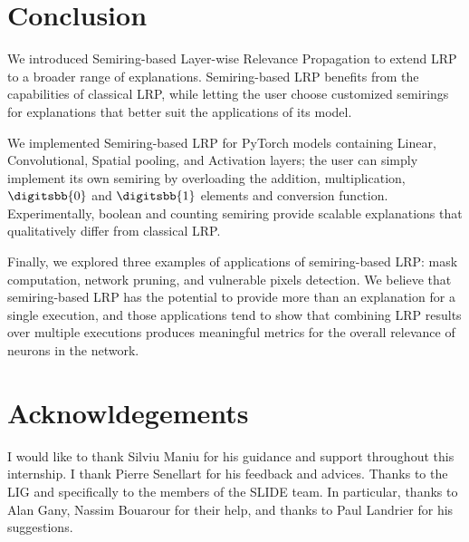 \documentclass{../cs-classes/cs-classes}
\newcommand*{\1}{\digitsbb{1}}
\newcommand*{\0}{\digitsbb{0}}
\begin{document}
\section{Conclusion}
We introduced Semiring-based Layer-wise Relevance Propagation to extend LRP to a broader range of explanations. Semiring-based LRP benefits from the capabilities of classical LRP, while letting the user choose customized semirings for explanations that better suit the applications of its model. 

We implemented Semiring-based LRP for PyTorch models containing Linear, Convolutional, Spatial pooling, and Activation layers; the user can simply implement its own semiring by overloading the addition, multiplication, $\0$ and $\1$ elements and conversion function. Experimentally, boolean and counting semiring provide scalable explanations that qualitatively differ from classical LRP.

Finally, we explored three examples of applications of semiring-based LRP: mask computation, network pruning, and vulnerable pixels detection. We believe that semiring-based LRP has the potential to provide more than an explanation for a single execution, and those applications tend to show that combining LRP results over multiple executions produces meaningful metrics for the overall relevance of neurons in the network. 

\section*{Acknowldegements}
I would like to thank Silviu Maniu for his guidance and support throughout this internship. I thank Pierre Senellart for his feedback and advices. Thanks to the LIG and specifically to the members of the SLIDE team. In particular, thanks to Alan Gany, Nassim Bouarour for their help, and thanks to Paul Landrier for his suggestions.

\nocite{*}
\printbibliography

\newpage
\appendix
\end{document}
